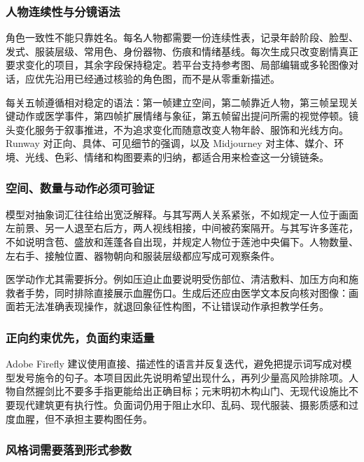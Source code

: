 \documentclass[lang=cn,a4paper,11pt,citestyle=gb7714-2015,bibstyle=gb7714-2015]{elegantpaper}
\begin{document}
\subsubsection{人物连续性与分镜语法}

角色一致性不能只靠姓名。每名人物都需要一份连续性表，记录年龄阶段、脸型、发式、服装层级、常用色、身份器物、伤痕和情绪基线。每次生成只改变剧情真正要求变化的项目，其余字段保持稳定。若平台支持参考图、局部编辑或多轮图像对话，应优先沿用已经通过核验的角色图，而不是从零重新描述。

每关五帧遵循相对稳定的语法：第一帧建立空间，第二帧靠近人物，第三帧呈现关键动作或医学事件，第四帧扩展情绪与象征，第五帧留出提问所需的视觉停顿。镜头变化服务于叙事推进，不为追求变化而随意改变人物年龄、服饰和光线方向。Runway 对正向、具体、可见细节的强调，以及 Midjourney 对主体、媒介、环境、光线、色彩、情绪和构图要素的归纳，都适合用来检查这一分镜链条\cite{runway2026prompt,midjourney2026prompt}。

\subsubsection{空间、数量与动作必须可验证}

模型对抽象词汇往往给出宽泛解释。与其写两人关系紧张，不如规定一人位于画面左前景、另一人退至右后方，两人视线相接，中间被药案隔开。与其写许多莲花，不如说明含苞、盛放和莲蓬各自出现，并规定人物位于莲池中央偏下。人物数量、左右手、接触位置、器物朝向和服装层级都应写成可观察条件。

医学动作尤其需要拆分。例如压迫止血要说明受伤部位、清洁敷料、加压方向和施救者手势，同时排除直接展示血腥伤口。生成后还应由医学文本反向核对图像：画面若无法准确表现操作，就退回象征性构图，不让错误动作承担教学任务。

\subsubsection{正向约束优先，负面约束适量}

Adobe Firefly 建议使用直接、描述性的语言并反复迭代，避免把提示词写成对模型发号施令的句子\cite{adobe2026prompt}。本项目因此先说明希望出现什么，再列少量高风险排除项。人物自然握剑比不要多手指更能给出正确目标；元末明初木构山门、无现代设施比不要现代建筑更有执行性。负面词仍用于阻止水印、乱码、现代服装、摄影质感和过度血腥，但不承担主要构图任务。

\subsubsection{风格词需要落到形式参数}
\end{document}
